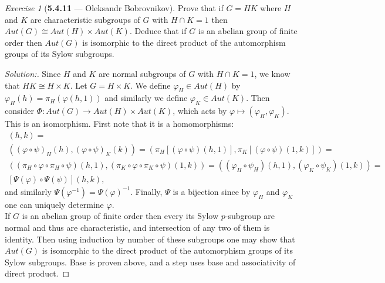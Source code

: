 \documentclass[12pt]{amsart}
\theoremstyle{remark}
\newtheorem*{exercise}{Exercise}%
\theoremstyle{mycomment}
\begin{document}
\begin{exercise}[\textbf{5.4.11} --- Oleksandr Bobrovnikov]
  Prove that if $G=HK$ where $H$ and $K$ are characteristic subgroups of $G$ with $H \cap K = 1$
  then $Aut(G) \cong Aut(H) \times Aut(K)$. Deduce that if $G$ is an abelian group of finite order then $Aut( G)$ is isomorphic to the direct product of the automorphism groups of its Sylow subgroups.
  \begin{proof}[Solution:]
    Since $H$ and $K$ are normal subgroups of $G$ with $H \cap K = 1$, we know that $HK\cong H\times K$.
    Let $G=H\times K$.
    We define $\varphi_H\in Aut(H)$  by $\varphi_H(h)=\pi_H(\varphi(h,1))$ and similarly we define $\varphi_K\in Aut(K)$.%
    Then consider $\Phi:Aut(G)\to Aut(H) \times Aut(K)$, which acts by $\varphi\mapsto(\varphi_H,\varphi_K)$.
    This is an isomorphism.
    First note that it is a homomorphisms:
    \begin{multline}
      [\Psi(\varphi\circ \psi)](h,k)
      =\\((\varphi\circ\psi)_H(h),(\varphi\circ\psi)_K(k))
      =(\pi_H[(\varphi\circ\psi)(h,1)],
      \pi_K[(\varphi\circ\psi)(1,k)]
      )=\\
      ((\pi_H\circ\varphi\circ\pi_H\circ\psi)(h,1),
      (\pi_K\circ\varphi\circ\pi_K\circ\psi)(1,k))
      =
      ((\varphi_H\circ\psi_H)(h,1),
      (\varphi_K\circ\psi_K)(1,k))
      =\\
      [\Psi(\varphi)\circ\Psi(\psi)](h,k),
    \end{multline}
    and similarly $\Psi(\varphi^{-1})=\Psi(\varphi)^{-1}$.
    Finally, $\Psi$ is a bijection since by $\varphi_H$ and $\varphi_K$ one can uniquely determine $\varphi$.
    \\ If $G$ is an abelian group of finite order then every its Sylow $p$-subgroup are normal and thus are characteristic, and intersection of any two of them is identity.
    Then using induction by number of these subgroups one may show that 
    $Aut( G)$ is isomorphic to the direct product of the automorphism groups of its Sylow subgroups.
    Base is proven above, and a step uses base and associativity of direct product. 


  \end{proof}
\end{exercise}
\vspace{.15in}
\end{document}

